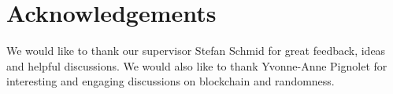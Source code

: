 \section{Acknowledgements}\label{sec:acknowledgements}
We would like to thank our supervisor Stefan Schmid for great feedback, ideas and helpful discussions. We would also like to thank Yvonne-Anne Pignolet for interesting and engaging discussions on blockchain and randomness.